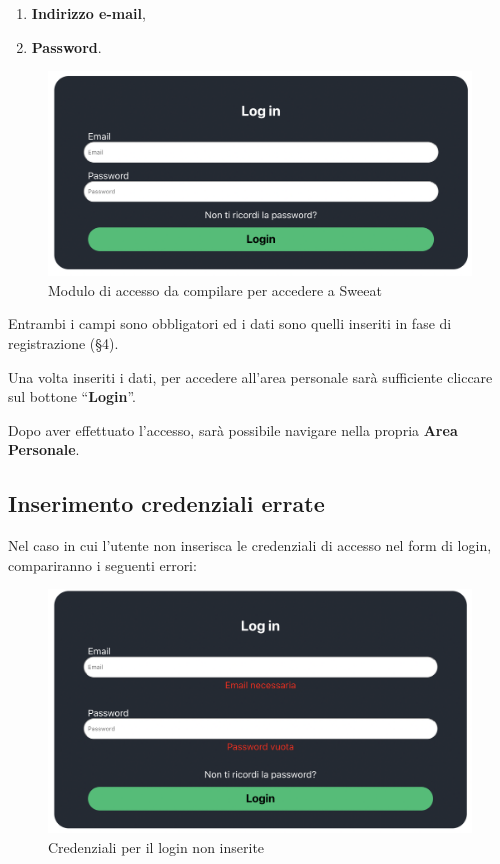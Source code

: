 \begin{enumerate}
\item \textbf{Indirizzo e-mail},
\item \textbf{Password}.
\end{enumerate}

\begin{figure}[H]
\centering
\includegraphics[scale=0.3]{./images/Login/FormLogin.png} 
\caption{Modulo di accesso da compilare per accedere a Sweeat}
\end{figure}

Entrambi i campi sono obbligatori ed i dati sono quelli inseriti in fase di registrazione (\S{4}). 

Una volta inseriti i dati, per accedere all’area personale sarà sufficiente cliccare sul bottone “\textbf{Login}”.

Dopo aver effettuato l’accesso, sarà possibile navigare nella propria \textbf{Area Personale}.

\subsection{Inserimento credenziali errate}

Nel caso in cui l'utente non inserisca le credenziali di accesso nel form di login, compariranno i seguenti errori: 

\begin{figure}[H]
\centering
\includegraphics[scale=0.3]{./images/Login/ErroreCampi.png} 
\caption{Credenziali per il login non inserite}
\end{figure}

